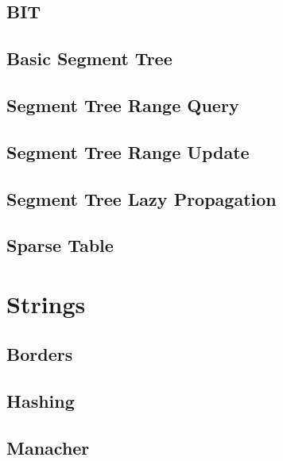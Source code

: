 \subsection{BIT}
\raggedbottom
\hrulefill
\subsection{ Basic Segment Tree}
\raggedbottom
\hrulefill
\subsection{   Segment Tree Range Query}
\raggedbottom
\hrulefill
\subsection{  Segment Tree Range Update}
\raggedbottom
\hrulefill
\subsection{Segment Tree Lazy Propagation}
\raggedbottom
\hrulefill
\subsection{Sparse Table}
\raggedbottom
\hrulefill

\section{Strings}
\subsection{Borders}
\raggedbottom
\hrulefill
\subsection{Hashing}
\raggedbottom
\hrulefill
\subsection{   Manacher}
\raggedbottom
\hrulefill
